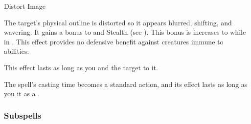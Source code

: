 \newpage
\begin{spellsection}{Distort Image}

\begin{spellcontent}

\begin{spelltargetinginfo}



\end{spelltargetinginfo}


\begin{spelleffects}



\spelleffect
The target's physical outline is distorted so it appears blurred, shifting, and wavering.
It gains a  bonus to  and Stealth (see ).
This bonus is increases to  while in .
This effect provides no defensive benefit against creatures immune to  abilities.

This effect lasts as long as you and the target  to it.








\end{spelleffects}

\end{spellcontent}
\begin{spellfooter}


\end{spellfooter}
\begin{spellsubcontent}


\begin{spellcantrip}
The spell's casting time becomes a standard action, and its effect lasts as long as you  it as a .
\end{spellcantrip}


\end{spellsubcontent}
\end{spellsection}


\subsubsection{Subspells}


